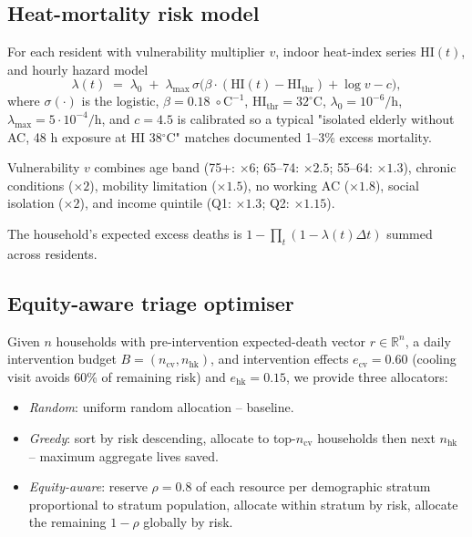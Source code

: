 \documentclass[11pt]{article}
\begin{document}
\subsection{Heat-mortality risk model}

For each resident with vulnerability multiplier $v$, indoor heat-index series $\text{HI}(t)$, and hourly hazard model
\[
\lambda(t) \;=\; \lambda_0 \;+\; \lambda_{\max}\,\sigma\!\big(\beta\cdot(\text{HI}(t) - \text{HI}_{\text{thr}}) + \log v - c\big),
\]
where $\sigma(\cdot)$ is the logistic, $\beta = 0.18\;{\circ}\text{C}^{-1}$, $\text{HI}_{\text{thr}} = 32^\circ$C, $\lambda_0 = 10^{-6}/\text{h}$, $\lambda_{\max} = 5\cdot 10^{-4}/\text{h}$, and $c = 4.5$ is calibrated so a typical "isolated elderly without AC, 48 h exposure at HI 38$^\circ$C" matches documented 1--3\% excess mortality.

Vulnerability $v$ combines age band (75+: $\times 6$; 65--74: $\times 2.5$; 55--64: $\times 1.3$), chronic conditions ($\times 2$), mobility limitation ($\times 1.5$), no working AC ($\times 1.8$), social isolation ($\times 2$), and income quintile (Q1: $\times 1.3$; Q2: $\times 1.15$).

The household's expected excess deaths is $1 - \prod_t (1 - \lambda(t) \Delta t)$ summed across residents.

\subsection{Equity-aware triage optimiser}

Given $n$ households with pre-intervention expected-death vector $r \in \mathbb R^n$, a daily intervention budget $B = (n_{\text{cv}}, n_{\text{hk}})$, and intervention effects $e_{\text{cv}} = 0.60$ (cooling visit avoids 60\% of remaining risk) and $e_{\text{hk}} = 0.15$, we provide three allocators:

\begin{itemize}[leftmargin=2em]
\item \emph{Random}: uniform random allocation -- baseline.
\item \emph{Greedy}: sort by risk descending, allocate to top-$n_{\text{cv}}$ households then next $n_{\text{hk}}$ -- maximum aggregate lives saved.
\item \emph{Equity-aware}: reserve $\rho = 0.8$ of each resource per demographic stratum proportional to stratum population, allocate within stratum by risk, allocate the remaining $1 - \rho$ globally by risk.
\end{itemize}
\end{document}
